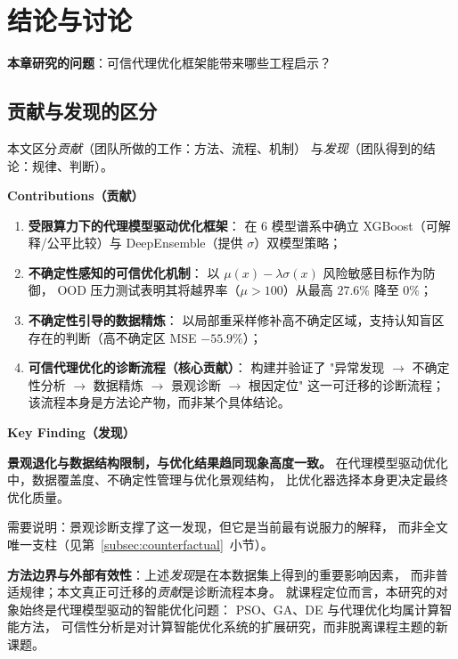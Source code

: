\section{结论与讨论}\label{sec:conclusion}

\begin{chapterquestion}
\textbf{本章研究的问题}：可信代理优化框架能带来哪些工程启示？
\end{chapterquestion}

\subsection{贡献与发现的区分}

本文区分\emph{贡献}（团队所做的工作：方法、流程、机制）
与\emph{发现}（团队得到的结论：规律、判断）。

\vspace{0.2cm}
\noindent\textbf{Contributions（贡献）}
\begin{enumerate}
    \item \textbf{受限算力下的代理模型驱动优化框架}：
        在 6 模型谱系中确立 XGBoost（可解释/公平比较）与 DeepEnsemble（提供 $\sigma$）双模型策略；
    \item \textbf{不确定性感知的可信优化机制}：
        以 $\mu(x)-\lambda\sigma(x)$ 风险敏感目标作为防御，
        OOD 压力测试表明其将越界率（$\mu>100$）从最高 $27.6\%$ 降至 $0\%$；
    \item \textbf{不确定性引导的数据精炼}：
        以局部重采样修补高不确定区域，支持认知盲区存在的判断（高不确定区 MSE $-55.9\%$）；
    \item \textbf{可信代理优化的诊断流程（核心贡献）}：
        构建并验证了
        "异常发现 $\to$ 不确定性分析 $\to$ 数据精炼 $\to$ 景观诊断 $\to$ 根因定位"
        这一可迁移的诊断流程；该流程本身是方法论产物，而非某个具体结论。
\end{enumerate}

\vspace{0.2cm}
\noindent\textbf{Key Finding（发现）}
\begin{chapterquestion}
\textbf{景观退化与数据结构限制，与优化结果趋同现象高度一致。}
在代理模型驱动优化中，数据覆盖度、不确定性管理与优化景观结构，
比优化器选择本身更决定最终优化质量。
\end{chapterquestion}

需要说明：景观诊断支撑了这一发现，但它是当前最有说服力的解释，
而非全文唯一支柱（见第~\ref{subsec:counterfactual}~小节）。

\vspace{0.2cm}
\noindent\textbf{方法边界与外部有效性}：上述\emph{发现}是在本数据集上得到的重要影响因素，
而非普适规律；本文真正可迁移的\emph{贡献}是诊断流程本身。
就课程定位而言，本研究的对象始终是代理模型驱动的智能优化问题：
PSO、GA、DE 与代理优化均属计算智能方法，
可信性分析是对计算智能优化系统的扩展研究，而非脱离课程主题的新课题。

